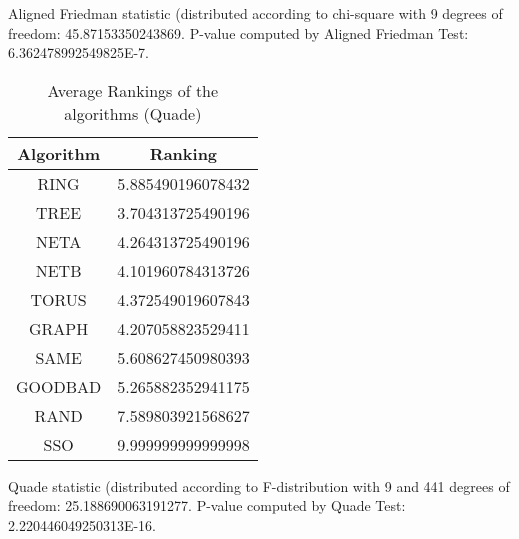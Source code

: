 \documentclass[a4paper,10pt]{article}
\begin{document}
\begin{landscape}
Aligned Friedman statistic (distributed according to chi-square with 9 degrees of freedom: 45.87153350243869. 
P-value computed by Aligned Friedman Test: 6.362478992549825E-7.\newline


\newpage

\begin{table}[!htp]
\centering
\caption{Average Rankings of the algorithms (Quade)
}\begin{tabular}{c|c}
Algorithm&Ranking\\
\hline
 RING&5.885490196078432\\
 TREE&3.704313725490196\\
 NETA&4.264313725490196\\
 NETB&4.101960784313726\\
 TORUS&4.372549019607843\\
 GRAPH&4.207058823529411\\
 SAME&5.608627450980393\\
 GOODBAD&5.265882352941175\\
 RAND&7.589803921568627\\
 SSO&9.999999999999998\\
\end{tabular}
\end{table}
Quade statistic (distributed according to F-distribution with 9 and 441 degrees of freedom: 25.188690063191277. 
P-value computed by Quade Test: 2.220446049250313E-16.\newline


\newpage


\end{landscape}
\end{document}
